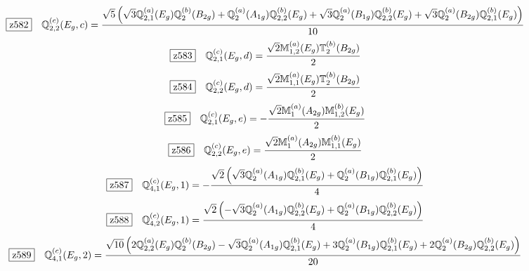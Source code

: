 \documentclass[fleqn,10pt,landscape]{jsarticle}
\begin{document}
\begin{dmath*}
\hspace*{3mm}\fbox{z582}\quad \mathbb{Q}_{2,2}^{(c)}(E_{g},c)=\frac{\sqrt{5} \left(\sqrt{3} \mathbb{Q}_{2,1}^{(a)}(E_{g}) \mathbb{Q}_{2}^{(b)}(B_{2g}) + \mathbb{Q}_{2}^{(a)}(A_{1g}) \mathbb{Q}_{2,2}^{(b)}(E_{g}) + \sqrt{3} \mathbb{Q}_{2}^{(a)}(B_{1g}) \mathbb{Q}_{2,2}^{(b)}(E_{g}) + \sqrt{3} \mathbb{Q}_{2}^{(a)}(B_{2g}) \mathbb{Q}_{2,1}^{(b)}(E_{g})\right)}{10}
\end{dmath*}
\begin{dmath*}
\hspace*{3mm}\fbox{z583}\quad \mathbb{Q}_{2,1}^{(c)}(E_{g},d)=\frac{\sqrt{2} \mathbb{M}_{1,2}^{(a)}(E_{g}) \mathbb{T}_{2}^{(b)}(B_{2g})}{2}
\end{dmath*}
\begin{dmath*}
\hspace*{3mm}\fbox{z584}\quad \mathbb{Q}_{2,2}^{(c)}(E_{g},d)=\frac{\sqrt{2} \mathbb{M}_{1,1}^{(a)}(E_{g}) \mathbb{T}_{2}^{(b)}(B_{2g})}{2}
\end{dmath*}
\begin{dmath*}
\hspace*{3mm}\fbox{z585}\quad \mathbb{Q}_{2,1}^{(c)}(E_{g},e)=- \frac{\sqrt{2} \mathbb{M}_{1}^{(a)}(A_{2g}) \mathbb{M}_{1,2}^{(b)}(E_{g})}{2}
\end{dmath*}
\begin{dmath*}
\hspace*{3mm}\fbox{z586}\quad \mathbb{Q}_{2,2}^{(c)}(E_{g},e)=\frac{\sqrt{2} \mathbb{M}_{1}^{(a)}(A_{2g}) \mathbb{M}_{1,1}^{(b)}(E_{g})}{2}
\end{dmath*}
\begin{dmath*}
\hspace*{3mm}\fbox{z587}\quad \mathbb{Q}_{4,1}^{(c)}(E_{g},1)=- \frac{\sqrt{2} \left(\sqrt{3} \mathbb{Q}_{2}^{(a)}(A_{1g}) \mathbb{Q}_{2,1}^{(b)}(E_{g}) + \mathbb{Q}_{2}^{(a)}(B_{1g}) \mathbb{Q}_{2,1}^{(b)}(E_{g})\right)}{4}
\end{dmath*}
\begin{dmath*}
\hspace*{3mm}\fbox{z588}\quad \mathbb{Q}_{4,2}^{(c)}(E_{g},1)=\frac{\sqrt{2} \left(- \sqrt{3} \mathbb{Q}_{2}^{(a)}(A_{1g}) \mathbb{Q}_{2,2}^{(b)}(E_{g}) + \mathbb{Q}_{2}^{(a)}(B_{1g}) \mathbb{Q}_{2,2}^{(b)}(E_{g})\right)}{4}
\end{dmath*}
\begin{dmath*}
\hspace*{3mm}\fbox{z589}\quad \mathbb{Q}_{4,1}^{(c)}(E_{g},2)=\frac{\sqrt{10} \left(2 \mathbb{Q}_{2,2}^{(a)}(E_{g}) \mathbb{Q}_{2}^{(b)}(B_{2g}) - \sqrt{3} \mathbb{Q}_{2}^{(a)}(A_{1g}) \mathbb{Q}_{2,1}^{(b)}(E_{g}) + 3 \mathbb{Q}_{2}^{(a)}(B_{1g}) \mathbb{Q}_{2,1}^{(b)}(E_{g}) + 2 \mathbb{Q}_{2}^{(a)}(B_{2g}) \mathbb{Q}_{2,2}^{(b)}(E_{g})\right)}{20}
\end{dmath*}
\end{document}
